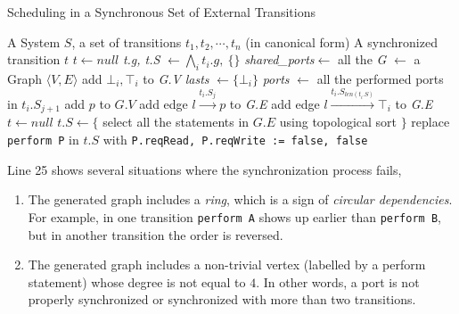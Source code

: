 \begin{algorithm}[t]
    \caption{Scheduling in a Synchronous Set of External Transitions}
    \label{alg:synchronize}
    \begin{algorithmic}[1]
        \REQUIRE A System $S$, a set of transitions $t_1,t_2,\cdots,t_n$ (in canonical form)
        \ENSURE A synchronized transition $t$
            \STATE $t\leftarrow null$
            \RETURN
        \ENDIF
        \STATE \emph{t.g, t.S} $\leftarrow \bigwedge_i t_i.g,\:\{\}$
        \STATE \emph{shared\_ports}$\leftarrow$ all the 
        \STATE 
        \STATE  \emph{G} $\leftarrow$ a Graph $\langle V,E\rangle$
            \STATE add $\bot_i, \top_i$ to \emph{G.V}
            \STATE \emph{lasts} $\leftarrow\{\bot_i\}$
                \STATE \emph{ports} $\leftarrow$ all the performed ports in $t_i.S_{j+1}$
                        \STATE add $p$ to $G.V$
                    \ENDIF
                    \STATE add edge $l \xrightarrow{t_i.S_j} p$ to \emph{G.E}
                \ENDFOR 
            \ENDFOR
                \STATE add edge $l \xrightarrow{t_i.S_{len(t_i.S)}} \top_i$ to \emph{G.E}
            \ENDFOR 
        \ENDFOR
        \STATE
            \STATE $t\leftarrow null$
        \ELSE
            \STATE $t.S\leftarrow\{$ select all the statements in $G.E$ using topological sort $\}$
            \STATE replace \texttt{perform P} in $t.S$ with \texttt{P.reqRead, P.reqWrite := false, false}
        \ENDIF
    \end{algorithmic}
\end{algorithm}

Line 25 shows several situations where the synchronization process fails,
\begin{enumerate}
    \item The generated graph includes a \emph{ring}, which is a sign of \emph{circular dependencies}. For example, in one transition \texttt{perform A} shows up earlier than \texttt{perform B}, but in another transition the order is reversed.
    \item The generated graph includes a non-trivial vertex (labelled by a perform statement) whose degree is not equal to $4$. In other words, a port is not properly synchronized or synchronized with more than two transitions. 
\end{enumerate}

